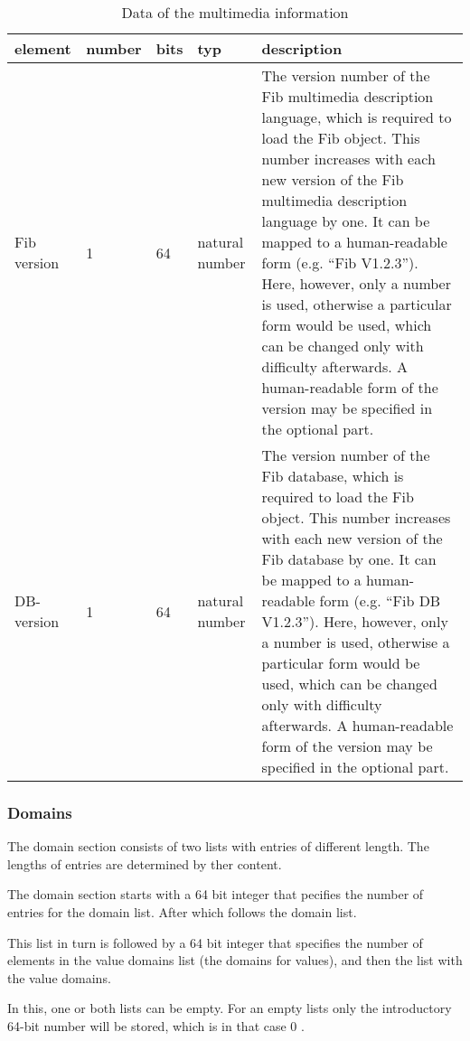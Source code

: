\begin{table}[htbp]
\begin{center}
\begin{tabular}{|p{20mm}|p{7mm}|p{7mm}|p{16mm}|p{70mm}|}\hline
	element & num\-ber & bits & typ & description \\\hline\hline
	Fib version & 1 & 64 & natural number & The version number of the Fib multimedia description language, which is required to load the Fib object. This number increases with each new version of the Fib multimedia description language by one. It can be mapped to a human-readable form (e.g. ``Fib V1.2.3''). Here, however, only a number is used, otherwise a particular form would be used, which can be changed only with difficulty afterwards. A human-readable form of the version may be specified in the optional part.\\\hline
	DB-version & 1 & 64 & natural number &  The version number of the Fib database, which is required to load the Fib object. This number increases with each new version of the Fib database by one. It can be mapped to a human-readable form (e.g. ``Fib DB V1.2.3''). Here, however, only a number is used, otherwise a particular form would be used, which can be changed only with difficulty afterwards. A human-readable form of the version may be specified in the optional part.\\\hline
\end{tabular}
\end{center}
\caption{Data of the multimedia information}
\label{tableCompressedMultimediainfo}
\end{table}


\subsubsection{Domains}
\label{secCompressedDefinitionranges}\label{secCompressedDomains}

The domain section consists of two lists with entries of different length. The lengths of entries are determined by ther content.

The domain section starts with a 64 bit integer that pecifies the number of entries for the domain list. After which follows the domain list.

This list in turn is followed by a 64 bit integer that specifies the number of elements in the value domains list (the domains for values), and then the list with the value domains.

In this, one or both lists can be empty. For an empty lists only the introductory 64-bit number will be stored, which is in that case 0 .

